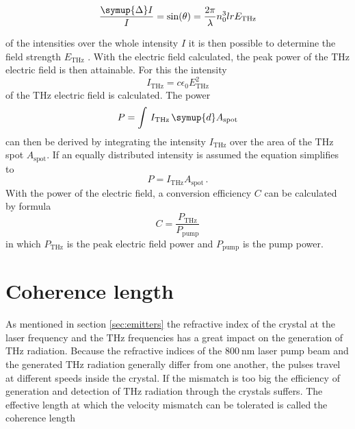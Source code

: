 \begin{equation}
    \frac{\symup{\Delta}I}{I} = \text{sin}(\theta) = \frac{2\pi}{\lambda} n_0^3 l r E_\text{THz}
    \label{eq:electricfield_A_B}
\end{equation}

of the intensities over the whole intensity $I$ it is then possible to determine the field strength $E_\text{THz}$ \cite{THZ_eltric_field}.
With the electric field calculated, the peak power of the $\si{\tera\hertz}$ electric field is then attainable.
For this the intensity
\begin{equation}
    I_\text{THz} = c \epsilon_0 E_\text{THz}^2
    \label{eq:intensity}
\end{equation}
of the $\si{\tera\hertz}$ electric field is calculated.
The power 
\begin{equation}
    P = \int\, I_\text{THz} \,\symup{d}A_\text{spot}
\end{equation}
can then be derived by integrating the intensity $I_\text{THz}$ over the area of the $\si{\tera\hertz}$ spot $A_\text{spot}$.
If an equally distributed intensity is assumed the equation simplifies to 
\begin{equation}
    P = I_\text{THz}A_\text{spot}\,.
    \label{eq:power}
\end{equation}
With the power of the electric field, a conversion efficiency $C$ can be calculated by formula
\begin{equation}
    C = \frac{P_\text{THz}}{P_\text{pump}}
    \label{eq:conversion}
\end{equation}
in which $P_\text{THz}$ is the peak electric field power and $P_\text{pump}$ is the pump power.


\section{Coherence length}
\label{sec:coherence_length}
As mentioned in section \ref{sec:emitters} the refractive index of the crystal at the laser frequency and the $\si{\tera\hertz}$ frequencies has a great impact on the generation of $\si{\tera\hertz}$ radiation.
Because the refractive indices of the $\SI{800}{\nano\meter}$ laser pump beam and the generated $\si{\tera\hertz}$ radiation generally differ from one another, the pulses travel at different speeds inside the crystal.
If the mismatch is too big the efficiency of generation and detection of $\si{\tera\hertz}$ radiation through the crystals suffers.
The effective length at which the velocity mismatch can be tolerated is called the coherence length

